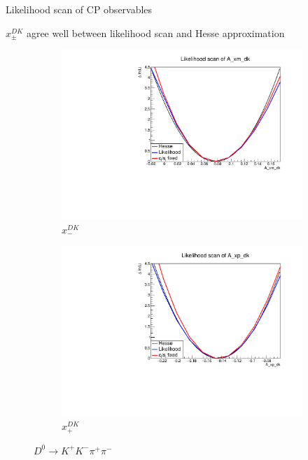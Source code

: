 \documentclass[xcolor={dvipsnames}]{beamer}
\begin{document}
\begin{frame}{Likelihood scan of CP observables}
  \begin{center}
    $x_\pm^{DK}$ agree well between likelihood scan and Hesse approximation
  \end{center}
  \begin{figure}
    \centering
    \begin{subfigure}{0.5\textwidth}
      \centering
      \includegraphics[width=1.0\textwidth]{Plots/A_xm_dk_likelihood_scan_KKpipi.pdf}
      \vspace{-0.3cm}
      \caption*{$x_-^{DK}$}
    \end{subfigure}%
    \begin{subfigure}{0.5\textwidth}
      \centering
      \includegraphics[width=1.0\textwidth]{Plots/A_xp_dk_likelihood_scan_KKpipi.pdf}
      \vspace{-0.3cm}
      \caption*{$x_+^{DK}$}
    \end{subfigure}
    \caption*{$D^0\to K^+K^-\pi^+\pi^-$}
  \end{figure}
\end{frame}
\end{document}
